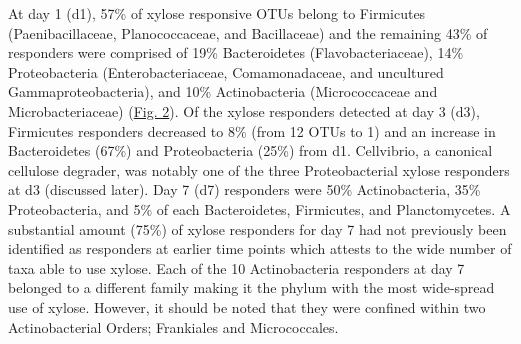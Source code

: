 At day 1 (d1), 57\% of xylose responsive OTUs belong to Firmicutes (Paenibacillaceae, Planococcaceae, and Bacillaceae) and the remaining 43\% of responders were comprised of 19\% Bacteroidetes (Flavobacteriaceae), 14\% Proteobacteria (Enterobacteriaceae, Comamonadaceae, and uncultured Gammaproteobacteria), and 10\% Actinobacteria (Micrococcaceae and Microbacteriaceae) (\href{https://www.authorea.com/users/3537/articles/3612/master/file/figures/l2fc_fig1/l2fc_fig.pdf}{Fig. 2}). Of the xylose responders detected at day 3 (d3), Firmicutes responders decreased to 8\% (from 12 OTUs to 1) and an increase in Bacteroidetes (67\%) and Proteobacteria (25\%) from d1. Cellvibrio, a canonical cellulose degrader, was notably one of the three Proteobacterial xylose responders at d3 (discussed later). Day 7 (d7) responders were 50\% Actinobacteria, 35\% Proteobacteria, and 5\% of each Bacteroidetes, Firmicutes, and Planctomycetes. A substantial amount (75\%) of xylose responders for day 7 had not previously been identified as responders at earlier time points which attests to the wide number of taxa able to use xylose. Each of the 10 Actinobacteria responders at day 7 belonged to a different family making it the phylum with the most wide-spread use of xylose. However, it should be noted that they were confined within two Actinobacterial Orders; Frankiales and Micrococcales. 

